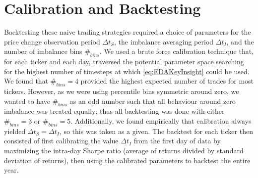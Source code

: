 \section{Calibration and Backtesting}
Backtesting these naive trading strategies required a choice of parameters for the price change observation period $\Delta t_S$, the imbalance averaging period $\Delta t_I$, and the number of imbalance bins $\#_{bins}$. We used a brute force calibration technique that, for each ticker and each day, traversed the potential parameter space searching for the highest number of timesteps at which \eqref{eq:EDAKeyInsight} could be used. We found that $\#_{bins} = 4$ provided the highest expected number of trades for most tickers. However, as we were using percentile bins symmetric around zero, we wanted to have $\#_{bins}$ as an odd number such that all behaviour around zero imbalance was treated equally; thus all backtesting was done with either $\#_{bins} = 3$ or $\#_{bins} = 5$. Additionally, we found empirically that calibration always yielded $\Delta t_S = \Delta t_I$, so this was taken as a given. The backtest for each ticker then consisted of first calibrating the value $\Delta t_I$ from the first day of data by maximizing the intra-day Sharpe ratio (average of returns divided by standard deviation of returns), then using the calibrated parameters to backtest the entire year.

